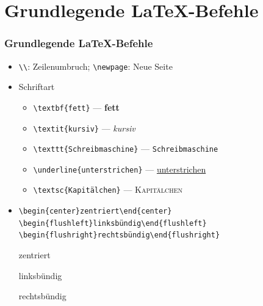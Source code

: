\section{Grundlegende \LaTeX-Befehle}

\begin{frame}[<+->][fragile]
	\frametitle{Grundlegende \LaTeX-Befehle}
	
	\begin{itemize}
		\item \lstinline!\\!: Zeilenumbruch; \lstinline!\newpage!: Neue Seite
		\item Schriftart
		\begin{itemize}
			\item \lstinline!\textbf{fett}! --- {\rmfamily\textbf{fett}}
			\item \lstinline!\textit{kursiv}! --- {\rmfamily\textit{kursiv}}
			\item \lstinline!\texttt{Schreibmaschine}! --- {\rmfamily\texttt{Schreibmaschine}}
			\item \lstinline!\underline{unterstrichen}! --- {\rmfamily\underline{unterstrichen}}
			\item \lstinline!\textsc{Kapitälchen}! --- {\rmfamily\textsc{Kapitälchen}}
		\end{itemize}
		\item \lstinline!\begin{center}zentriert\end{center} \begin{flushleft}linksbündig\end{flushleft} \begin{flushright}rechtsbündig\end{flushright}!
		
		{\justifying\rmfamily
		\begin{center}zentriert\end{center}
		\begin{flushleft}linksbündig\end{flushleft}
		\begin{flushright}rechtsbündig\end{flushright}}
	\end{itemize}
\end{frame}


